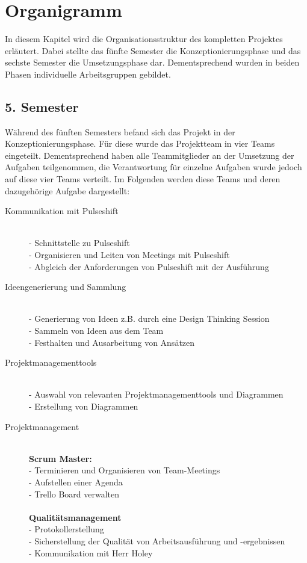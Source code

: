 \section{Organigramm}

In diesem Kapitel wird die Organisationsstruktur des kompletten Projektes erläutert. Dabei stellte das fünfte Semester die Konzeptionierungsphase und das sechste Semester die Umsetzungsphase dar. Dementsprechend wurden in beiden Phasen individuelle Arbeitsgruppen gebildet.

\subsection{5. Semester}
Während des fünften Semesters befand sich das Projekt in der Konzeptionierungsphase. Für diese wurde das Projektteam in vier Teams eingeteilt. Dementsprechend haben alle Teammitglieder an der Umsetzung der Aufgaben teilgenommen, die Verantwortung für einzelne Aufgaben wurde jedoch auf diese vier Teams verteilt. Im Folgenden werden diese Teams und deren dazugehörige Aufgabe dargestellt:

\begin{description}
\item[Kommunikation mit Pulseshift]\hfill \\
- Schnittstelle zu Pulseshift\\
- Organisieren und Leiten von Meetings mit Pulseshift\\
- Abgleich der Anforderungen von Pulseshift mit der Ausführung


\item[Ideengenerierung und Sammlung]\hfill \\
- Generierung von Ideen z.B. durch eine Design Thinking Session\\
- Sammeln von Ideen aus dem Team\\
- Festhalten und Ausarbeitung von Ansätzen

\item[Projektmanagementtools]\hfill \\
	- Auswahl von relevanten Projektmanagementtools und Diagrammen\\
	- Erstellung von Diagrammen

\item[Projektmanagement]\hfill \\
	\textbf{Scrum Master:}\\
	\phantom{hue}- Terminieren und Organisieren von Team-Meetings\\
	\phantom{hue}- Aufstellen einer Agenda\\
	\phantom{hue}- Trello Board verwalten\\\\
	\textbf{Qualitätsmanagement}\\
	\phantom{hue}- Protokollerstellung\\
	\phantom{hue}- Sicherstellung der Qualität von Arbeitsausführung und -ergebnissen\\
	\phantom{hue}- Kommunikation mit Herr Holey
\end{description}

